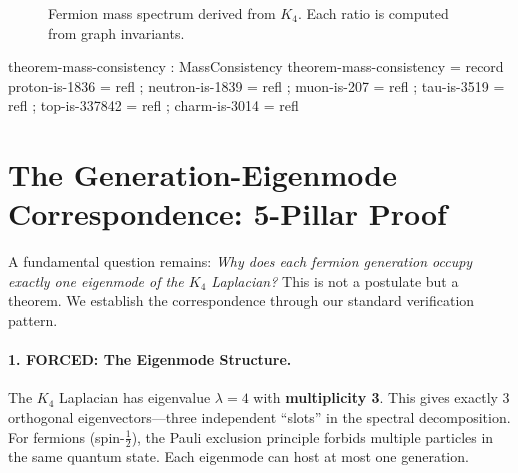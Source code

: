 \documentclass[11pt,a4paper]{book}
\begin{document}
\begin{figure}[h]
\centering
{}
\caption{Fermion mass spectrum derived from $K_4$. Each ratio is computed from graph invariants.}
\label{fig:fermion-masses}
\end{figure}

\begin{code}
theorem-mass-consistency : MassConsistency
theorem-mass-consistency = record
  { proton-is-1836   = refl
  ; neutron-is-1839  = refl
  ; muon-is-207      = refl
  ; tau-is-3519      = refl
  ; top-is-337842    = refl
  ; charm-is-3014    = refl
  }
\end{code}

\section{The Generation-Eigenmode Correspondence: 5-Pillar Proof}

A fundamental question remains: \emph{Why does each fermion generation occupy exactly one eigenmode of the $K_4$ Laplacian?} This is not a postulate but a theorem. We establish the correspondence through our standard verification pattern.

\paragraph{1. FORCED: The Eigenmode Structure.}

The $K_4$ Laplacian has eigenvalue $\lambda = 4$ with \textbf{multiplicity 3}. This gives exactly 3 orthogonal eigenvectors---three independent ``slots'' in the spectral decomposition. For fermions (spin-$\tfrac{1}{2}$), the Pauli exclusion principle forbids multiple particles in the same quantum state. Each eigenmode can host at most one generation.
\end{document}
